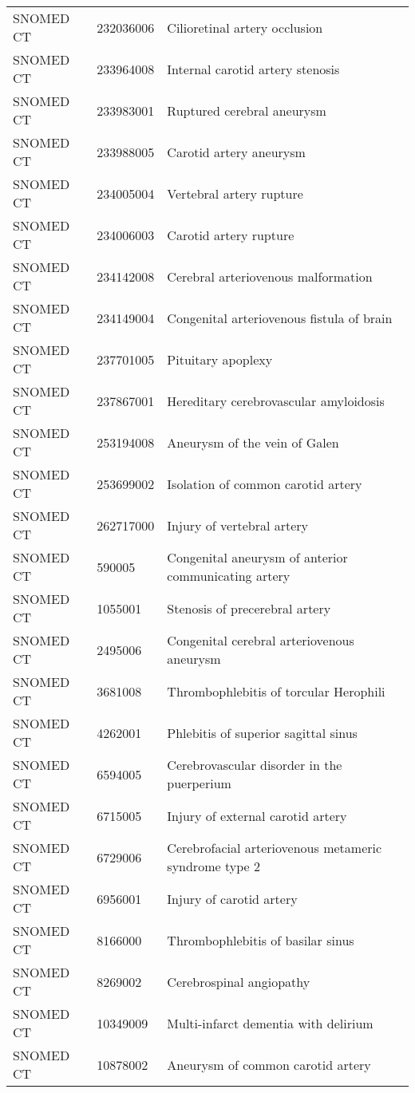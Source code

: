 \begin{longtable}{p{}p{}p{}}
  SNOMED CT & 232036006 & Cilioretinal artery occlusion \\ 
  SNOMED CT & 233964008 & Internal carotid artery stenosis \\ 
  SNOMED CT & 233983001 & Ruptured cerebral aneurysm \\ 
  SNOMED CT & 233988005 & Carotid artery aneurysm \\ 
  SNOMED CT & 234005004 & Vertebral artery rupture \\ 
  SNOMED CT & 234006003 & Carotid artery rupture \\ 
  SNOMED CT & 234142008 & Cerebral arteriovenous malformation \\ 
  SNOMED CT & 234149004 & Congenital arteriovenous fistula of brain \\ 
  SNOMED CT & 237701005 & Pituitary apoplexy \\ 
  SNOMED CT & 237867001 & Hereditary cerebrovascular amyloidosis \\ 
  SNOMED CT & 253194008 & Aneurysm of the vein of Galen \\ 
  SNOMED CT & 253699002 & Isolation of common carotid artery \\ 
  SNOMED CT & 262717000 & Injury of vertebral artery \\ 
  SNOMED CT & 590005 & Congenital aneurysm of anterior communicating artery \\ 
  SNOMED CT & 1055001 & Stenosis of precerebral artery \\ 
  SNOMED CT & 2495006 & Congenital cerebral arteriovenous aneurysm \\ 
  SNOMED CT & 3681008 & Thrombophlebitis of torcular Herophili \\ 
  SNOMED CT & 4262001 & Phlebitis of superior sagittal sinus \\ 
  SNOMED CT & 6594005 & Cerebrovascular disorder in the puerperium \\ 
  SNOMED CT & 6715005 & Injury of external carotid artery \\ 
  SNOMED CT & 6729006 & Cerebrofacial arteriovenous metameric syndrome type 2 \\ 
  SNOMED CT & 6956001 & Injury of carotid artery \\ 
  SNOMED CT & 8166000 & Thrombophlebitis of basilar sinus \\ 
  SNOMED CT & 8269002 & Cerebrospinal angiopathy \\ 
  SNOMED CT & 10349009 & Multi-infarct dementia with delirium \\ 
  SNOMED CT & 10878002 & Aneurysm of common carotid artery \\ 

\end{longtable}
